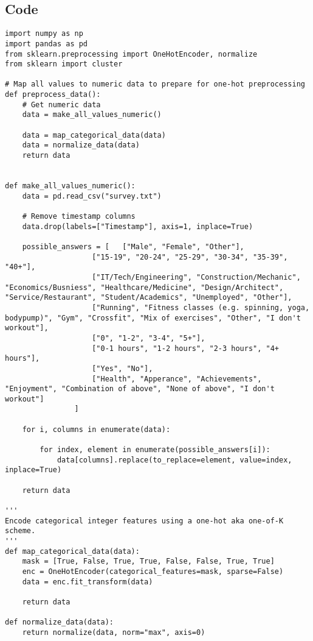 \documentclass[a4paper]{article}
\begin{document}
\subsection{Code}
\begin{lstlisting}
import numpy as np
import pandas as pd
from sklearn.preprocessing import OneHotEncoder, normalize
from sklearn import cluster

# Map all values to numeric data to prepare for one-hot preprocessing
def preprocess_data():
    # Get numeric data
    data = make_all_values_numeric()
    
    data = map_categorical_data(data)
    data = normalize_data(data)
    return data


def make_all_values_numeric():
    data = pd.read_csv("survey.txt")
    
    # Remove timestamp columns
    data.drop(labels=["Timestamp"], axis=1, inplace=True)

    possible_answers = [   ["Male", "Female", "Other"],
                    ["15-19", "20-24", "25-29", "30-34", "35-39", "40+"],
                    ["IT/Tech/Engineering", "Construction/Mechanic", "Economics/Busniess", "Healthcare/Medicine", "Design/Architect", "Service/Restaurant", "Student/Academics", "Unemployed", "Other"],
                    ["Running", "Fitness classes (e.g. spinning, yoga, bodypump)", "Gym", "Crossfit", "Mix of exercises", "Other", "I don't workout"],
                    ["0", "1-2", "3-4", "5+"],
                    ["0-1 hours", "1-2 hours", "2-3 hours", "4+ hours"],
                    ["Yes", "No"],
                    ["Health", "Apperance", "Achievements", "Enjoyment", "Combination of above", "None of above", "I don't workout"]
                ]

    for i, columns in enumerate(data):    

        for index, element in enumerate(possible_answers[i]): 
            data[columns].replace(to_replace=element, value=index, inplace=True)

    return data

'''
Encode categorical integer features using a one-hot aka one-of-K scheme.
'''
def map_categorical_data(data):
    mask = [True, False, True, True, False, False, True, True]
    enc = OneHotEncoder(categorical_features=mask, sparse=False)
    data = enc.fit_transform(data)
    
    return data

def normalize_data(data):
    return normalize(data, norm="max", axis=0)


\end{lstlisting}
\end{document}
